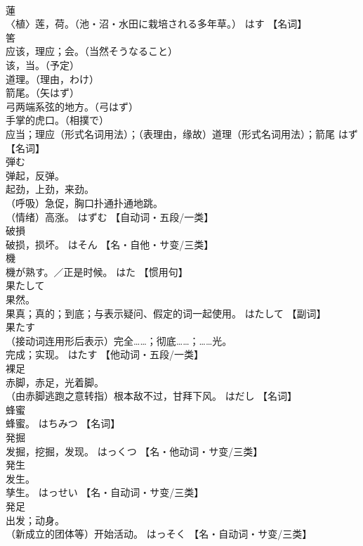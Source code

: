 \documentclass[8pt]{extreport}
\begin{document}
\begin{CJK}{UTF8}{min}
\\	蓮	
\\	〈植〉莲，荷。（池・沼・水田に栽培される多年草。）	はす		【名词】
\\	筈	
\\	应该，理应；会。（当然そうなること） 
\\	该，当。（予定） 
\\	道理。（理由，わけ） 
\\	箭尾。（矢はず） 
\\	弓两端系弦的地方。（弓はず） 
\\	手掌的虎口。（相撲で） 
\\	应当；理应（形式名词用法）；（表理由，缘故）道理（形式名词用法）；箭尾	はず		【名词】
\\	弾む	
\\	弹起，反弹。 
\\	起劲，上劲，来劲。 
\\	（呼吸）急促，胸口扑通扑通地跳。 
\\	（情绪）高涨。	はずむ		【自动词・五段/一类】
\\	破損	
\\	破损，损坏。	はそん		【名・自他・サ变/三类】
\\	機	
\\	機が熟す。／正是时候。	はた		【惯用句】
\\	果たして	
\\	果然。 
\\	果真；真的；到底；与表示疑问、假定的词一起使用。	はたして		【副词】
\\	果たす	
\\	（接动词连用形后表示）完全……；彻底……；……光。 
\\	完成；实现。	はたす		【他动词・五段/一类】
\\	裸足	
\\	赤脚，赤足，光着脚。 
\\	（由赤脚逃跑之意转指）根本敌不过，甘拜下风。	はだし		【名词】
\\	蜂蜜	
\\	蜂蜜。	はちみつ		【名词】
\\	発掘	
\\	发掘，挖掘，发现。	はっくつ		【名・他动词・サ变/三类】
\\	発生	
\\	发生。 
\\	孳生。	はっせい		【名・自动词・サ变/三类】
\\	発足	
\\	出发；动身。 
\\	（新成立的团体等）开始活动。	はっそく		【名・自动词・サ变/三类】

\end{CJK}
\end{document}
